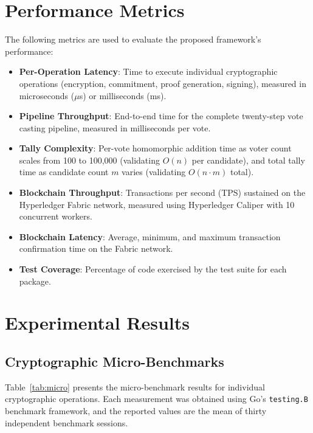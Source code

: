 \section{Performance Metrics}
\label{sec:perf-metrics}

The following metrics are used to evaluate the proposed framework's performance:

\begin{itemize}
    \item \textbf{Per-Operation Latency}: Time to execute individual cryptographic operations (encryption, commitment, proof generation, signing), measured in microseconds ($\mu$s) or milliseconds (ms).
    
    \item \textbf{Pipeline Throughput}: End-to-end time for the complete twenty-step vote casting pipeline, measured in milliseconds per vote.
    
    \item \textbf{Tally Complexity}: Per-vote homomorphic addition time as voter count scales from 100 to 100,000 (validating $O(n)$ per candidate), and total tally time as candidate count $m$ varies (validating $O(n \cdot m)$ total).
    
    \item \textbf{Blockchain Throughput}: Transactions per second (TPS) sustained on the Hyperledger Fabric network, measured using Hyperledger Caliper with 10 concurrent workers.
    
    \item \textbf{Blockchain Latency}: Average, minimum, and maximum transaction confirmation time on the Fabric network.
    
    \item \textbf{Test Coverage}: Percentage of code exercised by the test suite for each package.
\end{itemize}

\section{Experimental Results}
\label{sec:results}

\subsection{Cryptographic Micro-Benchmarks}
\label{subsec:micro}

Table~\ref{tab:micro} presents the micro-benchmark results for individual cryptographic operations. Each measurement was obtained using Go's \texttt{testing.B} benchmark framework, and the reported values are the mean of thirty independent benchmark sessions.

